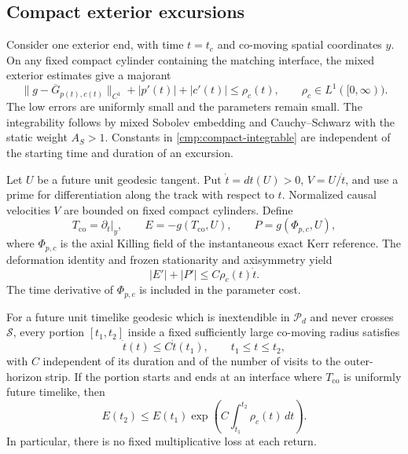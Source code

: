 \subsection{Compact exterior excursions}

Consider one exterior end, with time $t=t_e$ and co-moving spatial
coordinates $y$. On any fixed compact cylinder containing the matching
interface, the mixed exterior estimates give a majorant
\begin{equation}\label{cmp:compact-integrable}
 \|g-\overline G_{p(t),c(t)}\|_{C^1}
       +|p'(t)|+|c'(t)|\leq\rho_c(t),
 \qquad \rho_c\in L^1([0,\infty)).
\end{equation}
The low errors are uniformly small and the parameters remain small.
The integrability follows by mixed Sobolev embedding and
Cauchy--Schwarz with the static weight $A_S>1$. Constants in
\eqref{cmp:compact-integrable} are independent of the starting time
and duration of an excursion.

Let $U$ be a future unit geodesic tangent. Put
$\dot t=dt(U)>0$, $V=U/\dot t$, and use a prime for differentiation
along the track with respect to $t$. Normalized causal velocities $V$
are bounded on fixed compact cylinders. Define
\[
 T_{\mathrm{co}}=\partial_t|_y,
 \qquad E=-g(T_{\mathrm{co}},U),
 \qquad P=g(\Phi_{p,c},U),
\]
where $\Phi_{p,c}$ is the axial Killing field of the instantaneous
exact Kerr reference. The deformation identity and frozen stationarity
and axisymmetry yield
\begin{equation}\label{cmp:energy-momentum}
 |E'|+|P'|\leq C\rho_c(t)\dot t.
\end{equation}
The time derivative of $\Phi_{p,c}$ is included in the parameter cost.

\begin{lemma}\label{cmp:compact-excursions}
For a future unit timelike geodesic which is inextendible in
$\mathcal P_d$ and never crosses $\mathcal S$, every portion
$[t_1,t_2]$ inside a fixed sufficiently
large co-moving radius satisfies
\begin{equation}\label{cmp:compact-speed}
 \dot t(t)\leq C\dot t(t_1),\qquad t_1\leq t\leq t_2,
\end{equation}
with $C$ independent of its duration and of the number of visits to the
outer-horizon strip. If the portion starts and ends at an interface
where $T_{\mathrm{co}}$ is uniformly future timelike, then
\begin{equation}\label{cmp:return-energy}
 E(t_2)\leq E(t_1)
       \exp\left(C\int_{t_1}^{t_2}\rho_c(t)\,dt\right).
\end{equation}
In particular, there is no fixed multiplicative loss at each return.
\end{lemma}

